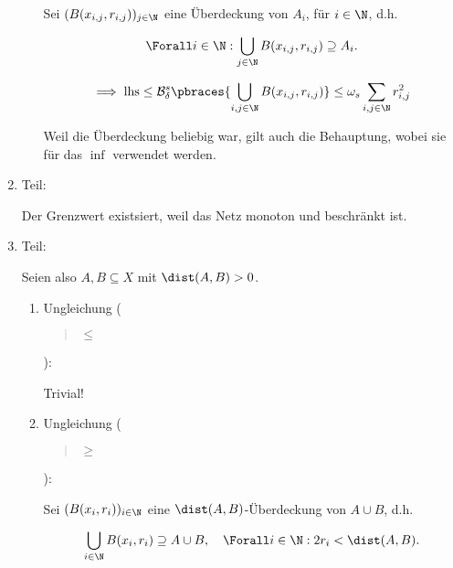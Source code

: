 \begin{solution}
\begin{enumerate}[label = \arabic*.]
\begin{enumerate}[label = \arabic*.]
        Sei $(B(x_{i, j}, r_{i, j}))_{j \in \N}$ eine Überdeckung von $A_i$, für $i \in \N$, d.h.

        \begin{align*}
            \Forall i \in \N:
                \bigcup_{j \in \N}
                    B(x_{i, j}, r_{i, j})
                \supseteq
                A_i.
        \end{align*}

        \begin{align*}
            \implies
            \mathrm{lhs}
            \leq
            \mathcal{B}_\delta^s
            \pbraces
            {
                \bigcup_{i, j \in \N}
                    B(x_{i, j}, r_{i, j})
            }
            \leq
            \omega_s
            \sum_{i, j \in \N}
                r_{i, j}^2
        \end{align*}

        Weil die Überdeckung beliebig war, gilt auch die Behauptung, wobei sie für das $\inf$ verwendet werden.

    \end{enumerate}

    \item Teil:
    
    Der Grenzwert existsiert, weil das Netz monoton und beschränkt ist.

    \item Teil:
    

    Seien also $A, B \subseteq X$ mit $\dist(A, B) > 0$.

    \begin{enumerate}

        \item Ungleichung (\blockquote{$\leq$}):
        
        Trivial!

        \item Ungleichung (\blockquote{$\geq$}):

        Sei $(B(x_i, r_i))_{i \in \N}$ eine $\dist(A, B)$-Überdeckung von $A \cup B$, d.h.

        \begin{align*}
            \bigcup_{i \in \N}
                B(x_i, r_i)
            \supseteq
            A \cup B,
            \quad
            \Forall i \in \N:
                2 r_i < \dist(A, B).
        \end{align*}


\end{enumerate}
\end{enumerate}
\end{solution}
